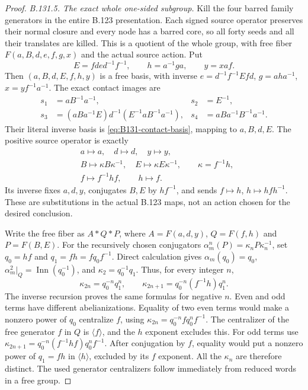 \begin{proof}
\emph{B.131.5. The exact whole one-sided subgroup.}
Kill the four barred family generators in the entire B.123 presentation.
Each signed source operator preserves their normal closure and every
node has a barred core, so all forty seeds and all their translates
are killed. This is a quotient of the whole group, with free fiber
$F(a,B,d,e,f,g,x)$ and the actual source action.
Put
\[
 E=fde d^{-1}f^{-1},\qquad h=a^{-1}ga,\qquad y=xaf.
\]
Then $(a,B,d,E,f,h,y)$ is a free basis, with inverse
$e=d^{-1}f^{-1}Efd$, $g=aha^{-1}$, $x=yf^{-1}a^{-1}$.
The exact contact images are
\begin{equation}\label{eq:B131-one-sided-contacts}
\begin{aligned}
 s_1&=aB^{-1}a^{-1},&s_2&=E^{-1},\\
 s_3&=(aBa^{-1}E)d^{-1}(E^{-1}aB^{-1}a^{-1}),&
 s_4&=aBa^{-1}B^{-1}a^{-1}.
\end{aligned}
\end{equation}
Their literal inverse basis is \eqref{eq:B131-contact-basis}, mapping
to $a,B,d,E$. The positive source operator is exactly
\begin{equation}\label{eq:B131-partial-inner}
\begin{aligned}
 &a\mapsto a,\quad d\mapsto d,\quad y\mapsto y,\\
 &B\mapsto\kappa B\kappa^{-1},\quad
 E\mapsto\kappa E\kappa^{-1},\qquad \kappa=f^{-1}h,\\
 &f\mapsto f^{-1}hf,\qquad h\mapsto f.
\end{aligned}
\end{equation}
Its inverse fixes $a,d,y$, conjugates $B,E$ by $hf^{-1}$, and sends
$f\mapsto h$, $h\mapsto hfh^{-1}$. These are substitutions in the
actual B.123 maps, not an action chosen for the desired conclusion.

Write the free fiber as
$A*Q*P$, where $A=F(a,d,y)$, $Q=F(f,h)$ and $P=F(B,E)$.
For the recursively chosen conjugators
$\alpha_m^n(P)=\kappa_nP\kappa_n^{-1}$, set $q_0=hf$ and
$q_1=fh=fq_0f^{-1}$. Direct calculation gives
$\alpha_m(q_0)=q_0$, $\alpha_m^2|_Q=\operatorname{Inn}(q_0^{-1})$,
and $\kappa_2=q_0^{-1}q_1$. Thus, for every integer $n$,
\begin{equation}\label{eq:B131-all-integer-conjugators}
 \kappa_{2n}=q_0^{-n}q_1^n,
 \qquad
 \kappa_{2n+1}=q_0^{-n}(f^{-1}h)q_1^n.
\end{equation}
The inverse recursion proves the same formulas for negative $n$.
Even and odd terms have different abelianizations. Equality of two
even terms would make a nonzero power of $q_0$ centralize $f$, using
$\kappa_{2n}=q_0^{-n}fq_0^nf^{-1}$. The centralizer of the free generator
$f$ in $Q$ is $\langle f\rangle$, and the $h$ exponent excludes this.
For odd terms use
$\kappa_{2n+1}=q_0^{-n}(f^{-1}hf)q_0^nf^{-1}$.
After conjugation by $f$, equality would put a nonzero power of
$q_1=fh$ in $\langle h\rangle$, excluded by its $f$ exponent.
All the $\kappa_n$ are therefore distinct. The used generator
centralizers follow immediately from reduced words in a free group.


\end{proof}
